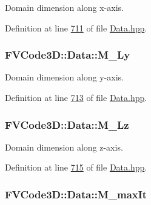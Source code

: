 Domain dimension along x-\/axis. 



Definition at line \hyperlink{Data_8hpp_source_l00711}{711} of file \hyperlink{Data_8hpp_source}{Data.\+hpp}.

\subsubsection[{\texorpdfstring{M\+\_\+\+Ly}{M_Ly}}]{ F\+V\+Code3\+D\+::\+Data\+::\+M\+\_\+\+Ly\hspace{0.3cm}{\ttfamily [protected]}}\hypertarget{classFVCode3D_1_1Data_ab1c235ca1a351fc10315c8b28f84549c}{}\label{classFVCode3D_1_1Data_ab1c235ca1a351fc10315c8b28f84549c}


Domain dimension along y-\/axis. 



Definition at line \hyperlink{Data_8hpp_source_l00713}{713} of file \hyperlink{Data_8hpp_source}{Data.\+hpp}.

\subsubsection[{\texorpdfstring{M\+\_\+\+Lz}{M_Lz}}]{ F\+V\+Code3\+D\+::\+Data\+::\+M\+\_\+\+Lz\hspace{0.3cm}{\ttfamily [protected]}}\hypertarget{classFVCode3D_1_1Data_aec68be07c237ed1170bdbb876b01ec95}{}\label{classFVCode3D_1_1Data_aec68be07c237ed1170bdbb876b01ec95}


Domain dimension along z-\/axis. 



Definition at line \hyperlink{Data_8hpp_source_l00715}{715} of file \hyperlink{Data_8hpp_source}{Data.\+hpp}.

\subsubsection[{\texorpdfstring{M\+\_\+max\+It}{M_maxIt}}]{ F\+V\+Code3\+D\+::\+Data\+::\+M\+\_\+max\+It\hspace{0.3cm}{\ttfamily [protected]}}\hypertarget{classFVCode3D_1_1Data_a2691a1563c9a9d1f9fa991acac368c6a}{}\label{classFVCode3D_1_1Data_a2691a1563c9a9d1f9fa991acac368c6a}


